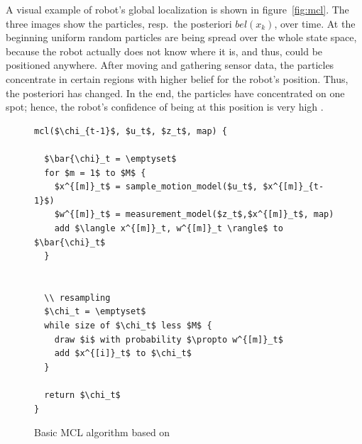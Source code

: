 A visual example of robot's global localization is shown in figure~\ref{fig:mcl}. The three images show the particles, resp.\ the posteriori $bel(x_k)$, over time. At the beginning uniform random particles are being spread over the whole state space, because the robot actually does not know where it is, and thus, could be positioned anywhere. After moving and gathering sensor data, the particles concentrate in certain regions with higher belief for the robot's position. Thus, the posteriori has changed. In the end, the particles have concentrated on one spot; hence, the robot's confidence of being at this position is very high \citep{thrun:prob_robo}.

\begin{figure}
\begin{lstlisting}[mathescape]
mcl($\chi_{t-1}$, $u_t$, $z_t$, map) {

  $\bar{\chi}_t = \emptyset$
  for $m = 1$ to $M$ {
    $x^{[m]}_t$ = sample_motion_model($u_t$, $x^{[m]}_{t-1}$)
    $w^{[m]}_t$ = measurement_model($z_t$,$x^{[m]}_t$, map)
    add $\langle x^{[m]}_t, w^{[m]}_t \rangle$ to $\bar{\chi}_t$
  }
  
  
  \\ resampling
  $\chi_t = \emptyset$
  while size of $\chi_t$ less $M$ {
    draw $i$ with probability $\propto w^{[m]}_t$
    add $x^{[i]}_t$ to $\chi_t$
  }
  
  return $\chi_t$
}
\end{lstlisting}
\caption{Basic \acl{MCL} algorithm based on \citet{thrun:prob_robo}}
\label{lst:mcl}
\end{figure}




